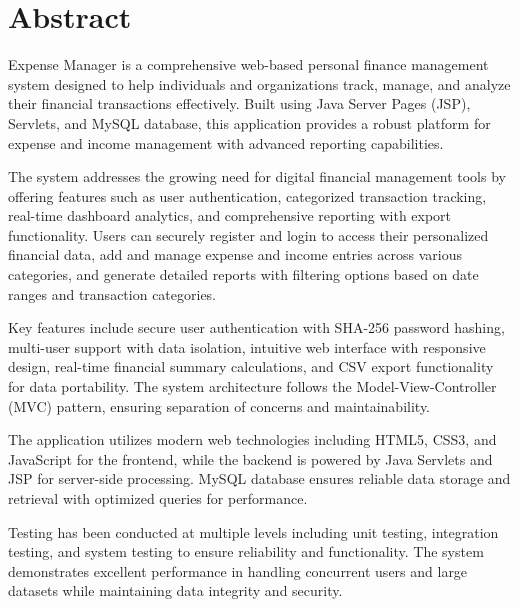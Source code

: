 \chapter*{Abstract}

Expense Manager is a comprehensive web-based personal finance management system designed to help individuals and organizations track, manage, and analyze their financial transactions effectively. Built using Java Server Pages (JSP), Servlets, and MySQL database, this application provides a robust platform for expense and income management with advanced reporting capabilities.

The system addresses the growing need for digital financial management tools by offering features such as user authentication, categorized transaction tracking, real-time dashboard analytics, and comprehensive reporting with export functionality. Users can securely register and login to access their personalized financial data, add and manage expense and income entries across various categories, and generate detailed reports with filtering options based on date ranges and transaction categories.

Key features include secure user authentication with SHA-256 password hashing, multi-user support with data isolation, intuitive web interface with responsive design, real-time financial summary calculations, and CSV export functionality for data portability. The system architecture follows the Model-View-Controller (MVC) pattern, ensuring separation of concerns and maintainability.

The application utilizes modern web technologies including HTML5, CSS3, and JavaScript for the frontend, while the backend is powered by Java Servlets and JSP for server-side processing. MySQL database ensures reliable data storage and retrieval with optimized queries for performance.

Testing has been conducted at multiple levels including unit testing, integration testing, and system testing to ensure reliability and functionality. The system demonstrates excellent performance in handling concurrent users and large datasets while maintaining data integrity and security.